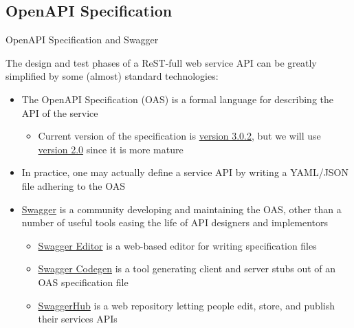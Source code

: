 \documentclass[presentation]{beamer}\mode<presentation>{\usetheme{AMSCesenaPurpleAndGold}}
\begin{document}
\subsection{OpenAPI Specification}

\begin{frame}{OpenAPI Specification and Swagger}

The design and test phases of a ReST-full web service \alert{API} can be greatly simplified by some (almost) standard technologies:
%
\begin{itemize}
    \item The \alert{OpenAPI Specification} (OAS) is a formal language for describing the API of the service
    \begin{itemize}
        \item Current version of the specification is \href{https://github.com/OAI/OpenAPI-Specification/blob/master/versions/3.0.2.md}{version 3.0.2}, but we will use \href{https://github.com/OAI/OpenAPI-Specification/blob/master/versions/2.0.md}{version 2.0} since it is more mature
    \end{itemize}
    
    \vfill
    
    \item In practice, one may actually define a service API by writing a \alert{YAML/JSON file} adhering to the OAS
    
    \vfill
    
    \item \href{https://swagger.io}{Swagger} is a community developing and maintaining the OAS, other than a number of useful tools easing the life of API designers and implementors
    \begin{itemize}
        \item \href{https://editor.swagger.io}{Swagger Editor} is a web-based editor for writing specification files
        
        \item \href{https://swagger.io/tools/swagger-codegen/}{Swagger Codegen} is a tool generating client and server stubs out of an OAS specification file
        
        \item \href{https://app.swaggerhub.com}{SwaggerHub} is a web repository letting people edit, store, and publish their services APIs
    \end{itemize}

\end{itemize}

\end{frame}
\end{document}
